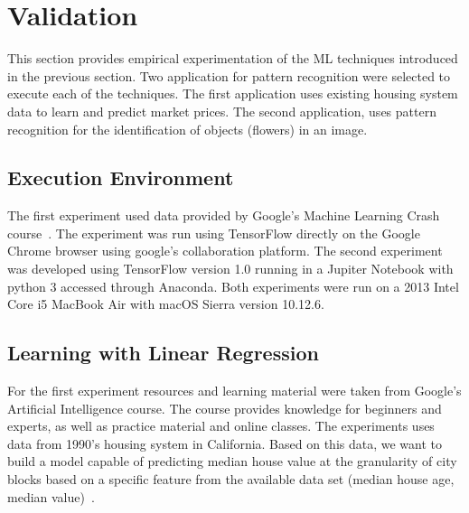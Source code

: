

\section{Validation}
\label{sec:validation}

This section provides empirical experimentation of the \ac{ML} techniques introduced in the previous 
section. Two application for pattern recognition were selected to execute each of the techniques. The 
first application uses existing housing system data to learn and predict market prices. The second 
application, uses pattern recognition for the identification of objects (flowers) in an image.

\subsection{Execution Environment}

The first experiment used data provided by Google's Machine Learning Crash 
course~\cite{mlchrome18}. The experiment was run using TensorFlow directly on the Google 
Chrome browser using google's collaboration platform. 
The second experiment was developed using TensorFlow version 1.0 running in a Jupiter 
Notebook with python 3 accessed through Anaconda. 
Both experiments were run on a 2013 Intel Core i5 MacBook Air with macOS Sierra version 10.12.6.

\subsection{Learning with Linear Regression}

For the first experiment resources and learning material were taken from Google’s Artificial 
Intelligence course. The course provides knowledge for beginners and experts, as well as practice 
material and online classes. The experiments uses data from 1990’s housing system in California. 
Based on this data, we want to build a model capable of predicting median house value at the 
granularity of city blocks based on a specific feature from the available data set (\eg median house age, 
median value)~\cite{mlchrome18}. 

